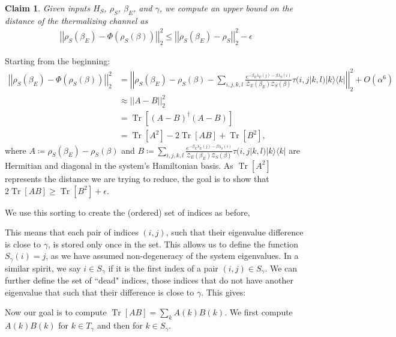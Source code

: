 \documentclass{article}
\newtheorem{claim}{Claim}
\newcommand{\ketbra}[2]{| #1\rangle\! \langle #2|}
\newcommand{\brackets}[1]{\left[ #1 \right]}
\newcommand{\norm}[1]{\left| \left| #1 \right| \right|}
\newcommand{\bigo}[1]{O\left( #1 \right)}
\DeclareMathOperator{\Tr}{Tr}
\newcommand{\trace}[1]{\Tr \brackets{ #1 }}
\newcommand{\partfun}{\mathcal{Z}}
\begin{document}
\begin{claim}
    Given inputs $H_S$, $\rho_S$, $\beta_E$, and $\gamma$, we compute an upper bound on the distance of the thermalizing channel as
    \begin{align}
        \norm{\rho_S(\beta_E) - \Phi(\rho_S(\beta))}_2^2 \leq \norm{\rho_S(\beta_E) - \rho_S}_2^2 - \epsilon
    \end{align}
    
\end{claim}


Starting from the beginning:
\begin{align}
    \norm{\rho_S(\beta_E) - \Phi(\rho_S(\beta))}_2^2 &= \norm{\rho_S(\beta_E) - \rho_S(\beta) - \sum_{i,j,k,l} \frac{e^{-\beta_E \lambda_E(j) - \beta \lambda_S(i)}}{\partfun_E(\beta_E) \partfun_S(\beta)} \tau(i,j|k,l) \ketbra{k}{k} }_2^2 + \bigo{\alpha^6} \\
    &\approx \norm{A - B}_2^2 \\
    &= \trace{(A - B)^\dagger (A - B)} \\
    &= \trace{A^2} - 2 \trace{A B} + \trace{B^2},
\end{align}
where $A \coloneqq \rho_S(\beta_E) - \rho_S(\beta)$ and $B \coloneqq \sum_{i,j,k,l} \frac{e^{-\beta_E \lambda_E(j) - \beta \lambda_S(i)}}{\partfun_E(\beta_E) \partfun_S(\beta)} \tau(i,j|k,l) \ketbra{k}{k} $ are Hermitian and diagonal in the system's Hamiltonian basis. As $\trace{A^2}$ represents the distance we are trying to reduce, the goal is to show that $2 \trace{AB} \geq \trace{B^2} + \epsilon$. 

We use this sorting to create the (ordered) set of indices as before,

This means that each pair of indices $(i,j)$, such that their eigenvalue difference is close to $\gamma$, is stored only once in the set. This allows us to define the function $S_\gamma(i) = j$, as we have assumed non-degeneracy of the system eigenvalues. In a similar spirit, we say $i \in S_{\gamma}$ if it is the first index of a pair $(i,j) \in S_{\gamma}$. We can further define the set of ``dead" indices, those indices that do not have another eigenvalue that such that their difference is close to $\gamma$. This gives:

Now our goal is to compute $\trace{A B} = \sum_{k} A(k) B(k)$. We first compute $A(k) B(k)$ for $k \in T_{\gamma}$ and then for $k \in S_{\gamma}$. 
\end{document}
